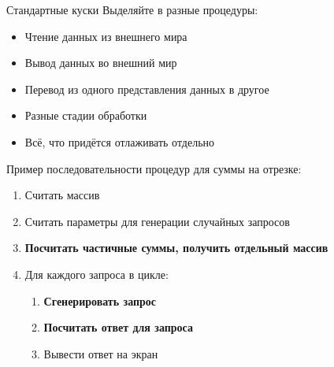 \begin{frame}{Стандартные куски}
	Выделяйте в разные процедуры:
	\begin{itemize}
	\item Чтение данных из внешнего мира
	\item Вывод данных во внешний мир
	\item Перевод из одного представления данных в другое
	\item Разные стадии обработки
	\item Всё, что придётся отлаживать отдельно
	\end{itemize}
	
	Пример последовательности процедур для суммы на отрезке:
	\begin{enumerate}
	\item Считать массив
	\item Считать параметры для генерации случайных запросов
	\item \textbf{Посчитать частичные суммы, получить отдельный массив}
	\item Для каждого запроса в цикле:
		\begin{enumerate}
		\item \textbf{Сгенерировать запрос}
		\item \textbf{Посчитать ответ для запроса}
		\item Вывести ответ на экран
		\end{enumerate}
	\end{enumerate}
\end{frame}
